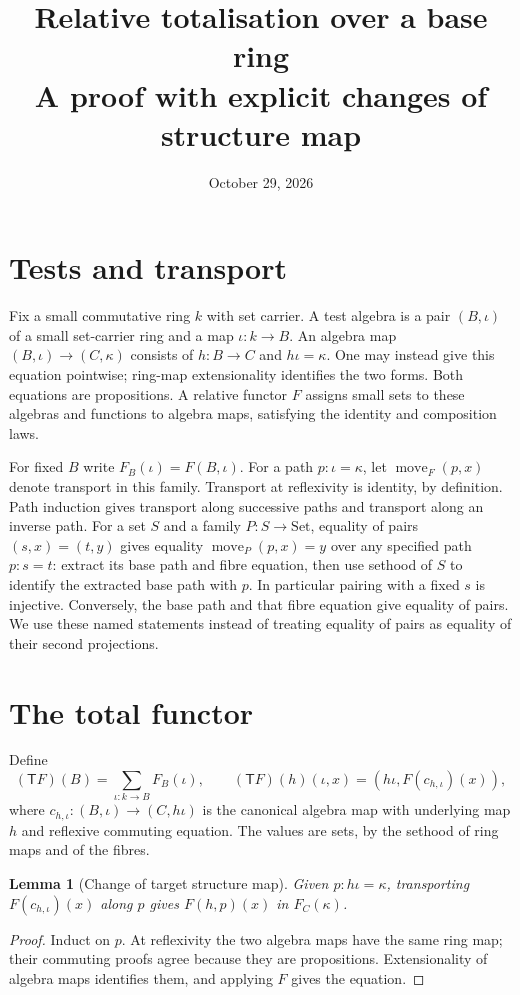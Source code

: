 \documentclass[11pt]{amsart}
\title[Relative totalisation over a base ring]{Relative totalisation over a base ring\\A proof with explicit changes of structure map}
\date{October 29, 2026}
\newtheorem{lemma}[theorem]{Lemma}
\theoremstyle{definition}\newtheorem{definition}[theorem]{Definition}
\newcommand{\mv}{\operatorname{move}}
\begin{document}
\raggedbottom\maketitle

\section{Tests and transport}
Fix a small commutative ring $k$ with set carrier. A test algebra is a
pair $(B,\iota)$ of a small set-carrier ring and a map $\iota:k\to B$.
An algebra map $(B,\iota)\to(C,\kappa)$ consists of $h:B\to C$ and
$h\iota=\kappa$. One may instead give this equation pointwise; ring-map
extensionality identifies the two forms. Both equations are propositions.
A relative functor $F$ assigns small sets to these algebras and functions
to algebra maps, satisfying the identity and composition laws.

For fixed $B$ write $F_B(\iota)=F(B,\iota)$. For a path
$p:\iota=\kappa$, let $\mv_F(p,x)$ denote transport in this family.
Transport at reflexivity is identity, by definition. Path induction gives
transport along successive paths and transport along an inverse path.
For a set $S$ and a family $P:S\to\mathrm{Set}$, equality of pairs
$(s,x)=(t,y)$ gives equality $\mv_P(p,x)=y$ over any specified path
$p:s=t$: extract its base path and fibre equation, then use sethood of
$S$ to identify the extracted base path with $p$. In particular pairing
with a fixed $s$ is injective. Conversely, the base path and that fibre
equation give equality of pairs. We use these named statements instead
of treating equality of pairs as equality of their second projections.

\section{The total functor}
Define
\[
 (\mathsf T F)(B)=\sum_{\iota:k\to B}F_B(\iota),\qquad
 (\mathsf T F)(h)(\iota,x)=(h\iota,F(c_{h,\iota})(x)),
\]
where $c_{h,\iota}:(B,\iota)\to(C,h\iota)$ is the canonical algebra
map with underlying map $h$ and reflexive commuting equation.
The values are sets, by the sethood of ring maps and of the fibres.

\begin{lemma}[Change of target structure map]\label{lem:change}
Given $p:h\iota=\kappa$, transporting $F(c_{h,\iota})(x)$ along $p$
gives $F(h,p)(x)$ in $F_C(\kappa)$.
\end{lemma}
\begin{proof}
Induct on $p$. At reflexivity the two algebra maps have the same ring map;
their commuting proofs agree because they are propositions. Extensionality
of algebra maps identifies them, and applying $F$ gives the equation.
\end{proof}
\end{document}
